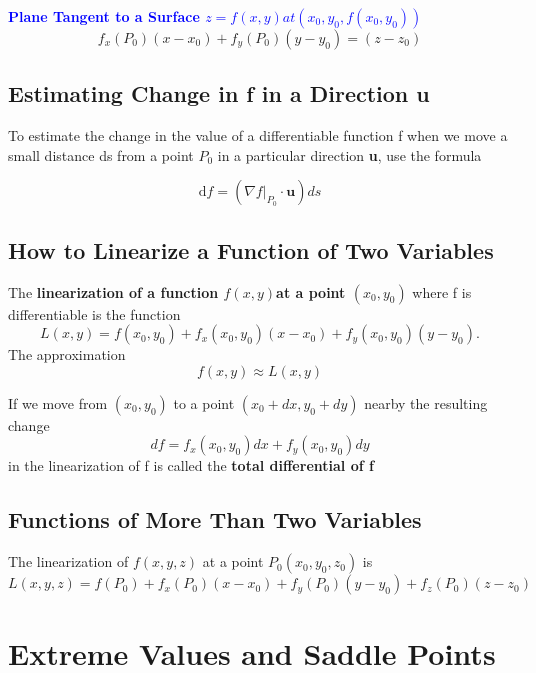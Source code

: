 \documentclass[12pt,a4paper]{article}
\newenvironment{definition}{\begin{definitionbox}}{\end{definitionbox}\vspace{1\baselineskip}}
\newenvironment{mynote}{\vspace{1\baselineskip}\begin{note}}{\end{note}\vspace{1\baselineskip}}
\newcommand{\fxy}{\(f(x,y)\)}
\begin{document}
\begin{mynote}
    \textcolor{blue}{\textbf{Plane Tangent to a Surface \(z = f(x,y) at (x_0,y_0,f(x_0,y_0))\)}}
    \[f_x(P_0)(x-x_0) + f_y(P_0)(y-y_0) = (z-z_0)\]

\end{mynote}

\subsection{Estimating Change in f in a Direction u }

\begin{mynote}
    To estimate the change in the value of a differentiable function f when we move a small distance ds from a point \(P_0\) in a particular direction \textbf{u}, use the formula

    \[\mathrm{d}f = (\nabla f|_{P_0} \cdot \mathbf{u}) ds\]

\end{mynote}


\subsection{How to Linearize a Function of Two Variables }

\begin{definition}
    The \textbf{linearization of a function \fxy at a point \((x_0,y_0)\)} where f is differentiable is the function
    \[L(x,y) = f(x_0,y_0) + f_x(x_0,y_0)(x-x_0) + f_y(x_0,y_0)(y-y_0).\]
    The approximation
    \[f(x,y) \approx L(x,y)\]
\end{definition}

\begin{definition}
    If we move from \((x_0,y_0)\) to a point \((x_0 + dx, y_0+ dy)\) nearby the resulting change 
    \[df = f_x(x_0,y_0)dx + f_y(x_0,y_0) dy\]
    in the linearization of f is called the \textbf{total differential of f}
\end{definition}

\subsection{Functions of More Than Two Variables}

The linearization of \(f(x,y,z)\) at a point \(P_0(x_0,y_0,z_0)\) is 
\[L(x,y,z) = f(P_0) + f_x(P_0)(x-x_0) + f_y(P_0)(y-y_0) + f_z(P_0)(z-z_0)\]


\section{Extreme Values and Saddle Points}
\end{document}
